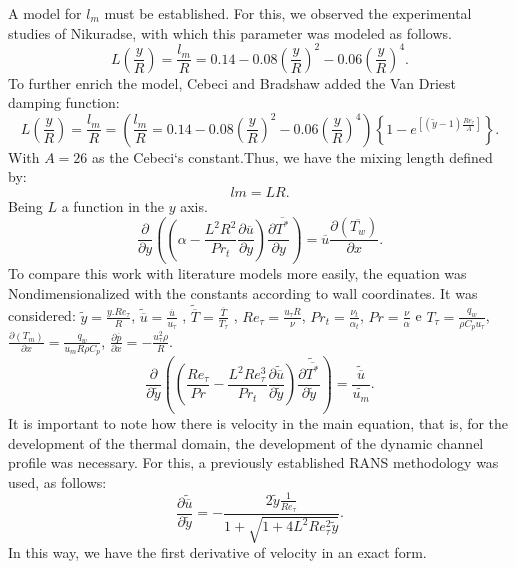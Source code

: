 \documentclass[10pt]{article} %
\begin{document}
A model for $ l_m $ must be established. For this, we observed the experimental studies of Nikuradse, with which this parameter was modeled as follows.
\begin{equation}
L\left(\frac{y}{R}\right) = \frac{l_m}{R} = 0.14 - 0.08 \left(\frac{y}{R}\right)^2 - 0.06\left(\frac{y}{R}\right)^4.
\end{equation}
To further enrich the model, Cebeci and Bradshaw added the Van Driest damping function:
\begin{equation}
L\left(\frac{y}{R}\right)  = \frac{l_m}{R} = \left(\frac{l_m}{R} = 0.14 - 0.08 \left(\frac{y}{R}\right)^2 - 0.06\left(\frac{y}{R}\right)^4\right)\left\{  1 - e^{[(\tilde{y} - 1) \frac{Re_\tau}{A}]}\right\}.
\end{equation}
With $A = 26$ as the Cebeci`s constant.Thus, we have the mixing length defined by:
\begin{equation}
lm = L R.
\end{equation}
Being $ L $ a function in the $ y $ axis.
\begin{equation}
{\frac{\partial{}}{\partial{y}}} \left( \left( \alpha   
- \frac{{L}^2 R ^2}{Pr_t}\frac{\partial \overline{u}}{\partial y} \right) \frac{\partial \overline{T^\ast}}{\partial y} \right)
= 
\overline{u}\frac{\partial{}\left(\overline{T_w}\right)  }{\partial{x}}.
\end{equation}
 To compare this work with literature models more easily, the equation was Nondimensionalized with the constants according to wall coordinates. It was considered: $ \tilde{y} = \frac{y . Re_\tau}{R} $, $ \tilde{\overline{u}} = \frac{\overline{u}}{u_\tau} $ , $ \tilde{\overline{T}} = \frac{\overline{T}}{T_\tau} $ , $Re_\tau = \frac{u_\tau R}{\nu}$, $Pr_t = \frac{\nu_t}{\alpha_t}$, $Pr = \frac{\nu}{\alpha}$ e $T_\tau = \frac{q_w}{\rho C_p u_\tau}$, $\frac{\partial{\left(T_m\right)}}{\partial{x}} = \frac{q_w}{u_m  R \rho  C_p } $, $\frac{\partial \overline{p}}{\partial x} = - \frac{u_\tau^2 \rho}{R} $.
\\
\begin{equation}
{\frac{\partial{}}{\partial{\tilde{y}}}} \left( \left( \frac{Re_\tau}{Pr}   
- \frac{{L}^2 Re_\tau ^3}{Pr_t}\frac{\partial \tilde{\overline{u}}}{\partial \tilde{y}} \right) \frac{\partial \tilde{\overline{T^\ast}}}{\partial \tilde{y}} \right)
= 
\frac{\tilde{\overline{u}}}{\tilde{u_m}}.
\end{equation}
It is important to note how there is velocity in the main equation, that is, for the development of the thermal domain, the development of the dynamic channel profile was necessary. For this, a previously established RANS methodology was used, as follows:
\begin{equation}
\frac{\partial \tilde{\overline{u}}}{\partial \tilde{y}} = - \frac{2 \tilde{y} \frac{1}{Re_\tau} }{ 1 + \sqrt{ 1 + 4 L ^2 Re_\tau ^2 \tilde{y}}}.
\end{equation}		
In this way, we have the first derivative of velocity in an exact form.
\end{document}
